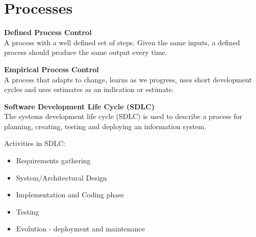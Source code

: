 \documentclass[a4paper,10pt]{article}
\begin{document}
\section*{Processes}
\begin{shaded}
	\noindent \textcolor{Emerald}{\textbf{Defined Process Control}} \\
	A process with a well defined set of steps. Given the same inputs, a defined process should produce the same output every time. 
\end{shaded}
\begin{shaded}
	\noindent \textcolor{Emerald}{\textbf{Empirical Process Control}} \\
	A process that adapts to change, learns as we progress, uses short development cycles and uses estimates as an indication or estimate. 
\end{shaded}
\begin{shaded}
	\noindent \textcolor{Emerald}{\textbf{Software Development Life Cycle (SDLC)}} \\
	The systems development life cycle (SDLC) is used to describe a process for planning, creating, testing and deploying an information system.  
\end{shaded}
\noindent Activities in SDLC: 
\begin{itemize}
	\item Requirements gathering 
	\item System/Architectural Design 
	\item Implementation and Coding phase
	\item Testing 
	\item Evolution - deployment and maintenance 
\end{itemize}
\end{document}
